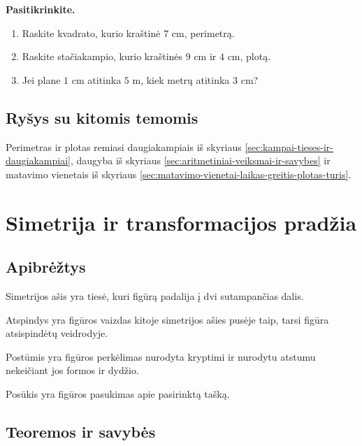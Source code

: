 \textbf{Pasitikrinkite.}
\begin{enumerate}[label=\arabic*.]
\item Raskite kvadrato, kurio kraštinė \(7\) cm, perimetrą.
\item Raskite stačiakampio, kurio kraštinės \(9\) cm ir \(4\) cm, plotą.
\item Jei plane \(1\) cm atitinka \(5\) m, kiek metrų atitinka \(3\) cm?
\end{enumerate}

\subsection{Ryšys su kitomis temomis}

Perimetras ir plotas remiasi daugiakampiais iš skyriaus \ref{sec:kampai-tieses-ir-daugiakampiai}, daugyba iš skyriaus \ref{sec:aritmetiniai-veiksmai-ir-savybes} ir matavimo vienetais iš skyriaus \ref{sec:matavimo-vienetai-laikas-greitis-plotas-turis}.

\section{Simetrija ir transformacijos pradžia}\label{sec:simetrija-ir-transformacijos-pradzia}

\subsection{Apibrėžtys}

\begin{apibreztis}
Simetrijos ašis yra tiesė, kuri figūrą padalija į dvi sutampančias dalis.
\end{apibreztis}

\begin{apibreztis}
Atspindys yra figūros vaizdas kitoje simetrijos ašies pusėje taip, tarsi figūra atsispindėtų veidrodyje.
\end{apibreztis}

\begin{apibreztis}
Postūmis yra figūros perkėlimas nurodyta kryptimi ir nurodytu atstumu nekeičiant jos formos ir dydžio.
\end{apibreztis}

\begin{apibreztis}
Posūkis yra figūros pasukimas apie pasirinktą tašką.
\end{apibreztis}

\subsection{Teoremos ir savybės}


